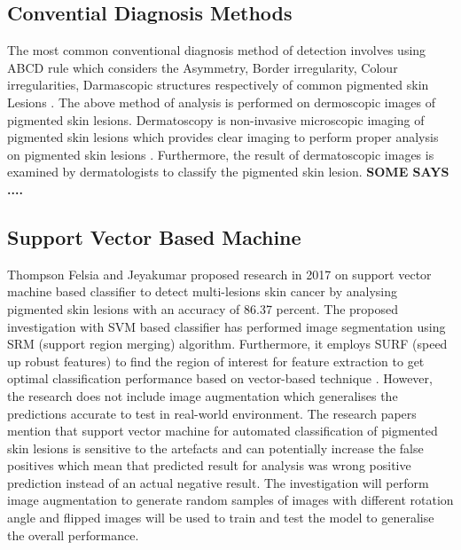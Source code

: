 \subsection{Convential Diagnosis Methods}

The most common conventional diagnosis method of detection involves
using ABCD rule which considers the Asymmetry, Border irregularity, Colour
irregularities,  Darmascopic structures respectively of common pigmented skin
Lesions \citep*{LOESCHER2013170}. The above method of analysis is performed on 
dermoscopic images of pigmented skin lesions.  Dermatoscopy is 
non-invasive microscopic imaging of pigmented skin lesions which provides clear imaging to perform 
proper analysis on pigmented skin lesions \citep*{LOESCHER2013170}. 
Furthermore, the result of dermatoscopic images is examined 
by dermatologists to classify the pigmented skin lesion.  \textbf{SOME SAYS ....}

\subsection{Support Vector Based Machine}
Thompson Felsia and Jeyakumar proposed research in 2017 on 
support vector machine based classifier to detect multi-lesions skin cancer by analysing pigmented skin lesions with an accuracy of 86.37 percent.
The proposed investigation with SVM based classifier has performed image segmentation using SRM (support region merging) algorithm. Furthermore, it employs SURF (speed up robust features) to find the region 
of interest for feature extraction to get optimal classification performance based on vector-based technique \citep*{thompson2017vector}. 
However, the research does not include image augmentation which generalises the predictions accurate to test in 
real-world environment. The research papers mention that support vector machine for automated classification of pigmented skin lesions is sensitive to the artefacts and can 
potentially increase the false positives which mean that predicted result for analysis was wrong positive prediction instead of an actual negative result. The investigation will perform image augmentation to generate random 
samples of images with different rotation angle and flipped images will be used to train and test the model to generalise the overall performance.

